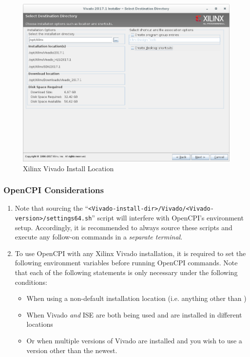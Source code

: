 \begin{flushleft}
\begin{flushleft}
\begin{enumerate}
\begin{figure}[H]
	\centerline{\includegraphics[scale=0.4]{figures/xilinx_vivado_2017_install_location}}
	\caption{Xilinx Vivado Install Location}
\end{figure}
\end{enumerate}
\subsubsection{OpenCPI Considerations}
\begin{enumerate}
\item Note that sourcing the ``\verb+<Vivado-install-dir>/Vivado/<Vivado-version>/settings64.sh+'' script will interfere with OpenCPI's environment setup. Accordingly, it is recommended to always source these scripts and execute any follow-on commands in a \textit{separate terminal}.
\item To use OpenCPI with any Xilinx Vivado installation, it is required to set the following environment variables before running OpenCPI commands. Note that each of the following  statements is only necessary under the following conditions:
\begin{itemize}
\item When using a non-default installation location (i.e. anything other than )
\item When Vivado \textit{and} ISE are both being used and are installed in different locations
\item Or when multiple versions of Vivado are installed and you wish to use a version other than the newest.
\end{itemize}


\end{enumerate}
\end{flushleft}
\end{flushleft}
